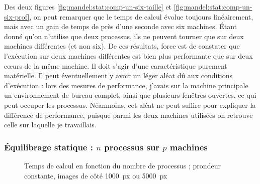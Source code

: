 Des deux figures \ref{fig:mandel:stat:comp-un-six-taille} et
\ref{fig:mandel:stat:comp-un-six-prof}, on peut remarquer que le temps
de calcul évolue toujours linéairement, mais avec un gain de temps de
près d'une seconde avec six machines. Étant donné qu'on n'utilise que
deux processus, ils ne peuvent tourner que sur deux machines
différentes (et non six). De ces résultats, force est de constater que
l'exécution sur deux machines différentes est bien plus performante
que sur deux cœurs de la même machine. Il doit s'agir d'une
caractéristique purement matérielle. Il peut éventuellement y avoir un
léger aléat dû aux conditions d'exécution : lors des mesures de
performance, j'avais sur la machine principale un environnement de
bureau complet, ainsi que plusieurs fenêtres ouvertes, ce qui peut
occuper les processus. Néanmoins, cet aléat ne peut suffire pour
expliquer la différence de performance, puisque parmi les deux
machines utilisées on retrouve celle sur laquelle je travaillais.

\subsubsection{Équilibrage statique : $n$ processus sur $p$ machines}

\begin{figure}
  \centering


  \caption{Temps de calcul en fonction du nombre de processus ;
    prondeur constante, images de côté 1000~px ou 5000~px}
  \label{fig:mandel:stat:six-nproc}
\end{figure}


